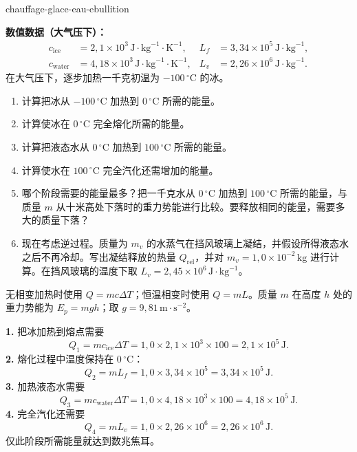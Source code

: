 
\begin{exo}{chauffage-glace-eau-ebullition}

\textbf{数值数据（大气压下）：}
\[
\begin{aligned}
c_{\text{ice}} &= 2{,}1\times10^3\,\text{J}\!\cdot\!\text{kg}^{-1}\!\cdot\!\text{K}^{-1},
& L_f &= 3{,}34\times10^5\,\text{J}\!\cdot\!\text{kg}^{-1},\\
c_{\text{water}} &= 4{,}18\times10^3\,\text{J}\!\cdot\!\text{kg}^{-1}\!\cdot\!\text{K}^{-1},
& L_v &= 2{,}26\times10^6\,\text{J}\!\cdot\!\text{kg}^{-1}.
\end{aligned}
\]
在大气压下，逐步加热一千克初温为 $-100\,{}^\circ\text{C}$ 的冰。

\begin{enumerate}
  \item 计算把冰从 $-100\,{}^\circ\text{C}$ 加热到 $0\,{}^\circ\text{C}$ 所需的能量。
  \item 计算使冰在 $0\,{}^\circ\text{C}$ 完全熔化所需的能量。
  \item 计算把液态水从 $0\,{}^\circ\text{C}$ 加热到 $100\,{}^\circ\text{C}$ 所需的能量。
  \item 计算使水在 $100\,{}^\circ\text{C}$ 完全汽化还需增加的能量。
  \item 哪个阶段需要的能量最多？把一千克水从 $0\,{}^\circ\text{C}$ 加热到 $100\,{}^\circ\text{C}$ 所需的能量，与质量 $m$ 从十米高处下落时的重力势能进行比较。要释放相同的能量，需要多大的质量下落？
  \item 现在考虑逆过程。质量为 $m_v$ 的水蒸气在挡风玻璃上凝结，并假设所得液态水之后不再冷却。写出凝结释放的热量 $Q_{\text{rel}}$，并对 $m_v=1{,}0\times10^{-2}\,\text{kg}$ 进行计算。在挡风玻璃的温度下取 $L_v=2{,}45\times10^6\,\text{J}\!\cdot\!\text{kg}^{-1}$。
\end{enumerate}

\begin{indication}
无相变加热时使用 $Q=mc\Delta T$；恒温相变时使用 $Q=mL$。质量 $m$ 在高度 $h$ 处的重力势能为 $E_p=mgh$；取 $g=9{,}81\,\text{m}\!\cdot\!\text{s}^{-2}$。
\end{indication}

\begin{solution}
\textbf{1.} 把冰加热到熔点需要
\[
Q_1=mc_{\text{ice}}\Delta T
=1{,}0\times2{,}1\times10^3\times100
=2{,}1\times10^5\,\text{J}.
\]
\textbf{2.} 熔化过程中温度保持在 $0\,{}^\circ\text{C}$：
\[
Q_2=mL_f=1{,}0\times3{,}34\times10^5=3{,}34\times10^5\,\text{J}.
\]
\textbf{3.} 加热液态水需要
\[
Q_3=mc_{\text{water}}\Delta T
=1{,}0\times4{,}18\times10^3\times100
=4{,}18\times10^5\,\text{J}.
\]
\textbf{4.} 完全汽化还需要
\[
Q_4=mL_v=1{,}0\times2{,}26\times10^6=2{,}26\times10^6\,\text{J}.
\]
仅此阶段所需能量就达到数兆焦耳。


\end{solution}
\end{exo}
